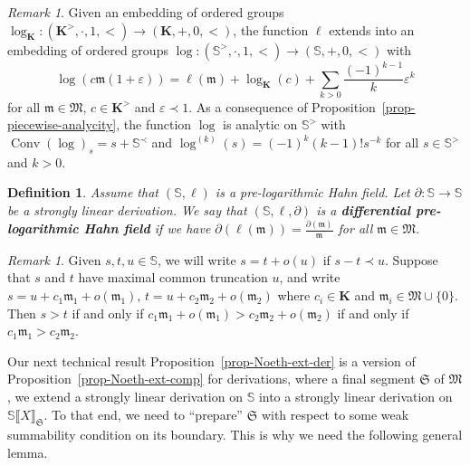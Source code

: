 \documentclass{article}
\newcommand{\of}{:}
\newcommand{\tmem}[1]{{\em #1\/}}
\newcommand{\tmop}[1]{\ensuremath{\operatorname{#1}}}
\newcommand{\tmstrong}[1]{\textbf{#1}}
\newtheorem{definition}[theorem]{Definition}
\theoremstyle{remark}\newtheorem*{convention*}{Convention}
\newtheorem{remark}[theorem]{Remark}
\begin{document}
\begin{remark}
  \label{rem-transserial-extension}Given an embedding of ordered groups
  $\log_{\mathbf{K}} \of (\mathbf{K}^{>}, \cdot, 1, <) \longrightarrow
  (\mathbf{K}, +, 0, <)$, the function $\ell$ extends {\cite[Lemmas~4.12 and
  5.1 and~Theorem~4.1]{Kuhl:ordexp}} into an embedding of ordered groups $\log
  \of (\mathbb{S}^{>}, \cdot, 1, <) \longrightarrow (\mathbb{S}, +, 0, <)$
  with
  \[ \log (c\mathfrak{m}(1 + \varepsilon)) = \ell (\mathfrak{m}) +
     \log_{\mathbf{K}} (c) + \sum_{k > 0} \frac{(- 1)^{k - 1}}{k}
     \varepsilon^k \]
  for all $\mathfrak{m} \in \mathfrak{M}$, $c \in \mathbf{K}^{>}$ and
  $\varepsilon \prec 1$. As a consequence of Proposition~\ref{prop-piecewise-analycity},
  the function $\log$ is analytic on $\mathbb{S}^{>}$ with $\tmop{Conv}
  (\log)_s = s +\mathbb{S}^{\prec}$ and $\log^{(k)} (s) = (- 1)^k  (k - 1)
  !s^{- k}$ for all $s \in \mathbb{S}^{>}$ and $k > 0$.
\end{remark}

\begin{definition}
  Assume that $(\mathbb{S}, \ell)$ is a pre-logarithmic Hahn field. Let
  $\partial \of \mathbb{S} \longrightarrow \mathbb{S}$ be a strongly linear
  derivation. We say that $(\mathbb{S}, \ell, \partial)$ is a
  {\tmem{{\tmstrong{differential pre-logarithmic Hahn field}}}} if we have
  $\partial (\ell (\mathfrak{m})) = \frac{\partial
  (\mathfrak{m})}{\mathfrak{m}}$ for all $\mathfrak{m} \in \mathfrak{M}$.
\end{definition}

\begin{remark}
  Given $s, t, u \in \mathbb{S}$, we will write $s = t + o (u)$ if $s - t
  \prec u$. Suppose that $s$ and $t$ have maximal common truncation $u$, and
  write $s = u + c_1 \mathfrak{m}_1 + o (\mathfrak{m}_1)$, $t = u + c_2
  \mathfrak{m}_2 + o (\mathfrak{m}_2)$ where $c_i \in \mathbf{K}$ and
  $\mathfrak{m}_i \in \mathfrak{M} \cup \{ 0 \}$. Then $s > t$ if and only if
  $c_1 \mathfrak{m}_1 + o (\mathfrak{m}_1) > c_2 \mathfrak{m}_2 + o
  (\mathfrak{m}_2)$ if and only if $c_1 \mathfrak{m}_1 > c_2 \mathfrak{m}_2$.
\end{remark}

Our next technical result Proposition~\ref{prop-Noeth-ext-der} is a version of
Proposition~\ref{prop-Noeth-ext-comp} for derivations, where a final segment
$\mathfrak{S}$ of $\mathfrak{M}$, we extend a strongly linear derivation on
$\mathbb{S}$ into a strongly linear derivation on $\mathbb{S} \llbracket X
\rrbracket_{\mathfrak{S}}$. To that end, we need to ``prepare'' $\mathfrak{S}$
with respect to some weak summability condition on its boundary. This is why
we need the following general lemma.
\end{document}
